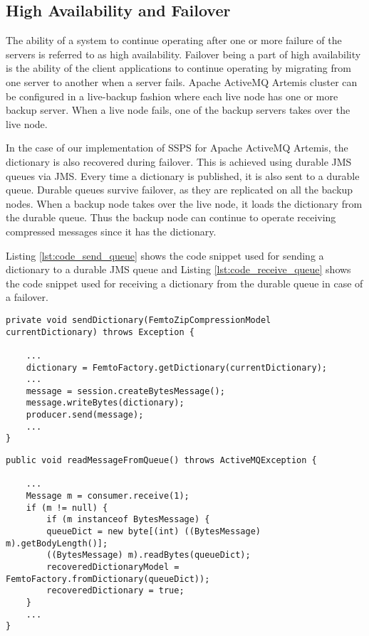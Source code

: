 \subsection{High Availability and Failover} \label{subsection:failover}

The ability of a system to continue operating after one or more failure of the servers is referred to as high availability. Failover being a part of high availability is the ability of the client applications to continue operating by migrating from one server to another when a server fails. Apache ActiveMQ Artemis cluster can be configured in a live-backup fashion where each live node has one or more backup server. When a live node fails, one of the backup servers takes over the live node.

In the case of our implementation of SSPS for Apache ActiveMQ Artemis, the dictionary is also recovered during failover. This is achieved using durable JMS queues via JMS. Every time a dictionary is published, it is also sent to a durable queue. Durable queues survive failover, as they are replicated on all the backup nodes. When a backup node takes over the live node, it loads the dictionary from the durable queue. Thus the backup node can continue to operate receiving compressed messages since it has the dictionary.

Listing \ref{lst:code_send_queue} shows the code snippet used for sending a dictionary to a durable JMS queue and Listing \ref{lst:code_receive_queue} shows the code snippet used for receiving a dictionary from the durable queue in case of a failover.

\bigskip
\begin{lstlisting}[style=JavaInputStyle,caption=Sending dictionary to a durable JMS queue, label={lst:code_send_queue}]
private void sendDictionary(FemtoZipCompressionModel currentDictionary) throws Exception {

    ...
    dictionary = FemtoFactory.getDictionary(currentDictionary);
    ...
    message = session.createBytesMessage();
    message.writeBytes(dictionary);
    producer.send(message);
    ...
}
\end{lstlisting}


\bigskip
\begin{lstlisting}[style=JavaInputStyle,caption=Receiving dictionary from a durable JMS queue, label={lst:code_receive_queue}]
public void readMessageFromQueue() throws ActiveMQException {

    ...
    Message m = consumer.receive(1);
    if (m != null) {
        if (m instanceof BytesMessage) {
        queueDict = new byte[(int) ((BytesMessage) m).getBodyLength()];
        ((BytesMessage) m).readBytes(queueDict);
        recoveredDictionaryModel = FemtoFactory.fromDictionary(queueDict));
        recoveredDictionary = true;
    }
    ...
}
\end{lstlisting}